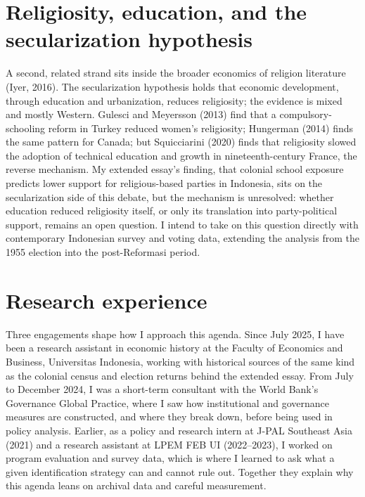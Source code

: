 \documentclass[letterpaper,11pt,leqno]{article}
\begin{document}
\section{Religiosity, education, and the secularization hypothesis}\label{s:religion}

A second, related strand sits inside the broader economics of religion literature (Iyer, 2016). The secularization hypothesis holds that economic development, through education and urbanization, reduces religiosity; the evidence is mixed and mostly Western. Gulesci and Meyersson (2013) find that a compulsory-schooling reform in Turkey reduced women's religiosity; Hungerman (2014) finds the same pattern for Canada; but Squicciarini (2020) finds that religiosity slowed the adoption of technical education and growth in nineteenth-century France, the reverse mechanism. My extended essay's finding, that colonial school exposure predicts lower support for religious-based parties in Indonesia, sits on the secularization side of this debate, but the mechanism is unresolved: whether education reduced religiosity itself, or only its translation into party-political support, remains an open question. I intend to take on this question directly with contemporary Indonesian survey and voting data, extending the analysis from the 1955 election into the post-Reformasi period.

\section{Research experience}\label{s:experience}

Three engagements shape how I approach this agenda. Since July 2025, I have been a research assistant in economic history at the Faculty of Economics and Business, Universitas Indonesia, working with historical sources of the same kind as the colonial census and election returns behind the extended essay. From July to December 2024, I was a short-term consultant with the World Bank's Governance Global Practice, where I saw how institutional and governance measures are constructed, and where they break down, before being used in policy analysis. Earlier, as a policy and research intern at J-PAL Southeast Asia (2021) and a research assistant at LPEM FEB UI (2022--2023), I worked on program evaluation and survey data, which is where I learned to ask what a given identification strategy can and cannot rule out. Together they explain why this agenda leans on archival data and careful measurement.
\end{document}
